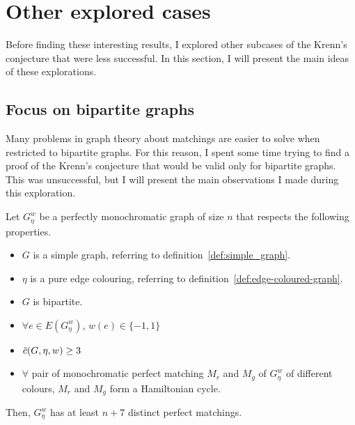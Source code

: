 \section{Other explored cases}
\label{sec:other-explored-cases}

Before finding these interesting results, I explored other subcases of the Krenn's conjecture that were less successful.
In this section, I will present the main ideas of these explorations.

\subsection{Focus on bipartite graphs}
\label{subsec:focus-on-bipartite-graphs}

Many problems in graph theory about matchings are easier to solve when restricted to bipartite graphs.
For this reason, I spent some time trying to find a proof of the Krenn's conjecture that would be valid only for bipartite graphs.
This was unsuccessful, but I will present the main observations I made during this exploration.

\begin{lemma}
    \label{lem:bipartite_graphs}
    Let $G_\eta^w$ be a perfectly monochromatic graph of size $n$ that respects the following properties.
    \begin{itemize}
        \item $G$ is a simple graph, referring to definition~\ref{def:simple_graph}.
        \item $\eta$ is a pure edge colouring, referring to definition~\ref{def:edge-coloured-graph}.
        \item $G$ is bipartite.
        \item $\forall e \in E(G_\eta^w)$, $w(e) \in \{-1, 1\}$
        \item $\Tilde{c}(G, \eta, w) \geq 3$
        \item $\forall$ pair of monochromatic perfect matching $M_r$ and $M_g$ of $G_\eta^w$ of different colours, $M_r$ and $M_g$ form a Hamiltonian cycle.
    \end{itemize}
    Then, $G_\eta^w$ has at least $n + 7$ distinct perfect matchings.   %
\end{lemma}

